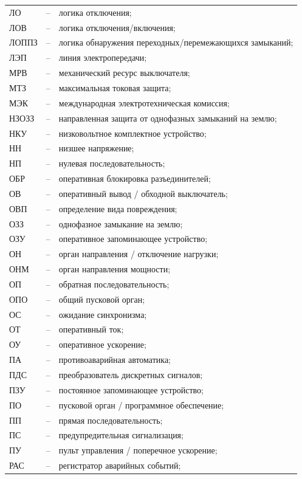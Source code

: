 \begin{longtable}{>{\raggedright\arraybackslash}m{2cm}>{\raggedright\arraybackslash}m{0.5cm}>{\raggedright\arraybackslash}m{20cm}}
ЛО & -- & логика отключения; \\
ЛОВ & -- & логика отключения/включения; \\
ЛОППЗ & -- & логика обнаружения переходных/перемежающихся замыканий; \\
ЛЭП & -- & линия электропередачи; \\
МРВ & -- & механический ресурс выключателя; \\
МТЗ & -- & максимальная токовая защита; \\
МЭК & -- & международная электротехническая комиссия; \\
НЗОЗЗ & -- & направленная защита от однофазных замыканий на землю; \\
НКУ & -- & низковольтное комплектное устройство; \\
НН & -- & низшее напряжение; \\
НП & -- & нулевая последовательность; \\
ОБР & -- & оперативная блокировка разъединителей; \\
ОВ & -- & оперативный вывод / обходной выключатель; \\
ОВП & -- & определение вида повреждения; \\
ОЗЗ & -- & однофазное замыкание на землю; \\
ОЗУ & -- & оперативное запоминающее устройство; \\
ОН & -- & орган направления / отключение нагрузки; \\
ОНМ & -- & орган направления мощности; \\
ОП & -- & обратная последовательность; \\
ОПО & -- & общий пусковой орган; \\
ОС & -- & ожидание синхронизма; \\
ОТ & -- & оперативный ток; \\
ОУ & -- & оперативное ускорение; \\
ПА & -- & противоаварийная автоматика; \\
ПДС & -- & преобразователь дискретных сигналов; \\
ПЗУ & -- & постоянное запоминающее устройство; \\
ПО & -- & пусковой орган / программное обеспечение; \\
ПП & -- & прямая последовательность; \\
ПС & -- & предупредительная сигнализация; \\
ПУ & -- & пульт управления / поперечное ускорение; \\
РАС & -- & регистратор аварийных событий; \\

\end{longtable}
